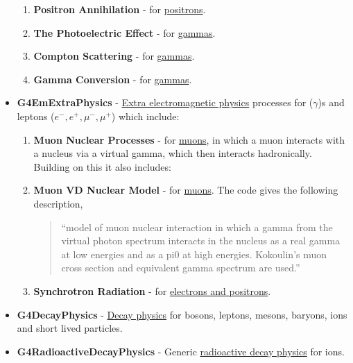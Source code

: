 \documentclass[8pt]{refart}
\begin{document}
\begin{itemize}
\begin{enumerate}[label=(\alph*)]
        \item \textbf{Positron Annihilation} - for \href{https://apc.u-paris.fr/~franco/g4doxy/html/classG4eplusAnnihilation.html}{positrons}.
        \item \textbf{The Photoelectric Effect} - for \href{https://apc.u-paris.fr/~franco/g4doxy/html/classG4PhotoElectricEffect.html}{gammas}.
        \item \textbf{Compton Scattering} - for \href{https://apc.u-paris.fr/~franco/g4doxy/html/classG4ComptonScattering.html}{gammas}.
        \item \textbf{Gamma Conversion} - for \href{https://apc.u-paris.fr/~franco/g4doxy/html/classG4GammaConversion.html}{gammas}.
    \end{enumerate}
    \item \textbf{G4EmExtraPhysics} - \href{https://apc.u-paris.fr/~franco/g4doxy4.10/html/class_g4_em_extra_physics.html}{Extra electromagnetic physics} processes for ($\gamma$)s and leptons ($e^-,e^+,\mu^-,\mu^+$) which include:
    \begin{enumerate}[label=(\alph*)]
        \item \textbf{Muon Nuclear Processes} - for \href{https://apc.u-paris.fr/~franco/g4doxy4.10/html/class_g4_muon_nuclear_process.html}{muons}, in which a muon interacts with a nucleus via a virtual gamma, which then interacts hadronically.  Building on this it also includes:
        \item \textbf{Muon VD Nuclear Model} - for \href{https://apc.u-paris.fr/~franco/g4doxy4.10/html/class_g4_muon_v_d_nuclear_model.html}{muons}.  The code gives the following description,
        \begin{quotation}
            ``model of muon nuclear interaction in which a gamma from the virtual photon spectrum interacts in the nucleus as a real gamma at low energies and as a pi0 at high energies.  Kokoulin's muon cross section and equivalent gamma spectrum are used.''
        \end{quotation}
        \item \textbf{Synchrotron Radiation} - for \href{https://apc.u-paris.fr/~franco/g4doxy4.10/html/class_g4_synchrotron_radiation.html}{electrons and positrons}.
    \end{enumerate}
    \item \textbf{G4DecayPhysics} - \href{https://apc.u-paris.fr/~franco/g4doxy/html/classG4DecayPhysics.html}{Decay physics} for bosons, leptons, mesons, baryons, ions and short lived particles.
    \item \textbf{G4RadioactiveDecayPhysics} - Generic \href{https://apc.u-paris.fr/~franco/g4doxy/html/classG4RadioactiveDecayPhysics.html}{radioactive decay physics} for ions.

\end{itemize}
\end{document}
